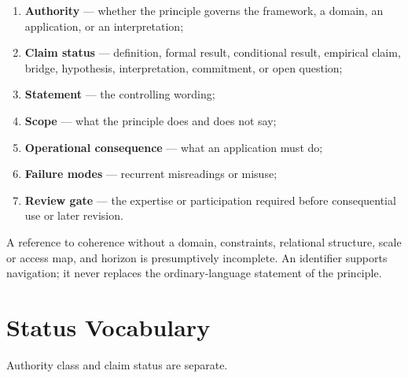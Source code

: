 \documentclass[
  11pt,
]{article}
\providecommand{\tightlist}{%
  \setlength{\itemsep}{0pt}\setlength{\parskip}{0pt}}
\begin{document}
\begin{enumerate}
\def\labelenumi{\arabic{enumi}.}
\tightlist
\item
  \textbf{Authority} --- whether the principle governs the framework, a
  domain, an application, or an interpretation;
\item
  \textbf{Claim status} --- definition, formal result, conditional
  result, empirical claim, bridge, hypothesis, interpretation,
  commitment, or open question;
\item
  \textbf{Statement} --- the controlling wording;
\item
  \textbf{Scope} --- what the principle does and does not say;
\item
  \textbf{Operational consequence} --- what an application must do;
\item
  \textbf{Failure modes} --- recurrent misreadings or misuse;
\item
  \textbf{Review gate} --- the expertise or participation required
  before consequential use or later revision.
\end{enumerate}

A reference to coherence without a domain, constraints, relational
structure, scale or access map, and horizon is presumptively incomplete.
An identifier supports navigation; it never replaces the
ordinary-language statement of the principle.

\section{Status Vocabulary}\label{status-vocabulary}

Authority class and claim status are separate.
\end{document}

